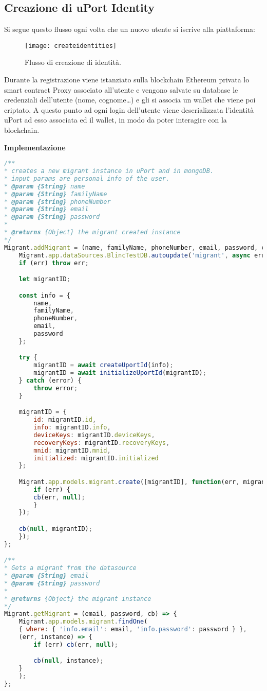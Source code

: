 \newpage

\subsection{Creazione di uPort Identity}

Si segue questo flusso ogni volta che un nuovo utente si iscrive alla piattaforma:

\begin{figure}[!ht]
    \texttt{[image: createidentities]}
    \caption{Flusso di creazione di identità.}
    \label{fig:createidentities}
\end{figure}

Durante la registrazione viene istanziato sulla blockchain Ethereum privata 
lo smart contract Proxy associato all’utente e vengono salvate su database le credenziali
dell’utente (nome, cognome…) e gli si associa un wallet che viene poi criptato. A questo punto
ad ogni login dell’utente viene deserializzata l’identità uPort
ad esso associata ed il wallet, in modo da poter interagire con la blockchain.

\textbf{Implementazione}

\begin{lstlisting}[language=JavaScript]
/**
* creates a new migrant instance in uPort and in mongoDB.
* input params are personal info of the user.
* @param {String} name
* @param {String} familyName
* @param {string} phoneNumber
* @param {String} email
* @param {String} password
*
* @returns {Object} the migrant created instance
*/
Migrant.addMigrant = (name, familyName, phoneNumber, email, password, cb) => {
    Migrant.app.dataSources.BlincTestDB.autoupdate('migrant', async err => {
    if (err) throw err;

    let migrantID;

    const info = {
        name,
        familyName,
        phoneNumber,
        email,
        password
    };

    try {
        migrantID = await createUportId(info);
        migrantID = await initializeUportId(migrantID);
    } catch (error) {
        throw error;
    }

    migrantID = {
        id: migrantID.id,
        info: migrantID.info,
        deviceKeys: migrantID.deviceKeys,
        recoveryKeys: migrantID.recoveryKeys,
        mnid: migrantID.mnid,
        initialized: migrantID.initialized
    };

    Migrant.app.models.migrant.create([migrantID], function(err, migrant) {
        if (err) {
        cb(err, null);
        }
    });

    cb(null, migrantID);
    });
};

/**
* Gets a migrant from the datasource
* @param {String} email
* @param {String} password
*
* @returns {Object} the migrant instance
*/
Migrant.getMigrant = (email, password, cb) => {
    Migrant.app.models.migrant.findOne(
    { where: { 'info.email': email, 'info.password': password } },
    (err, instance) => {
        if (err) cb(err, null);

        cb(null, instance);
    }
    );
};
\end{lstlisting}

